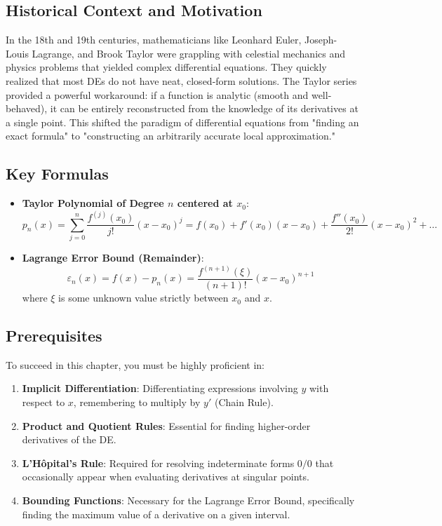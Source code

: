 \documentclass[11pt, letterpaper]{article}
\theoremstyle{definition}
\theoremstyle{remark}
\begin{document}
\subsection{Historical Context and Motivation}
In the 18th and 19th centuries, mathematicians like Leonhard Euler, Joseph-Louis Lagrange, and Brook Taylor were grappling with celestial mechanics and physics problems that yielded complex differential equations. They quickly realized that most DEs do not have neat, closed-form solutions. The Taylor series provided a powerful workaround: if a function is analytic (smooth and well-behaved), it can be entirely reconstructed from the knowledge of its derivatives at a single point. This shifted the paradigm of differential equations from "finding an exact formula" to "constructing an arbitrarily accurate local approximation."

\subsection{Key Formulas}
\begin{itemize}
    \item \textbf{Taylor Polynomial of Degree $n$ centered at $x_0$}:
    \[ p_n(x) = \sum_{j=0}^n \frac{f^{(j)}(x_0)}{j!} (x - x_0)^j = f(x_0) + f'(x_0)(x-x_0) + \frac{f''(x_0)}{2!}(x-x_0)^2 + \dots \]
    \item \textbf{Lagrange Error Bound (Remainder)}:
    \[ \varepsilon_n(x) = f(x) - p_n(x) = \frac{f^{(n+1)}(\xi)}{(n+1)!} (x - x_0)^{n+1} \]
    where $\xi$ is some unknown value strictly between $x_0$ and $x$.
\end{itemize}

\subsection{Prerequisites}
To succeed in this chapter, you must be highly proficient in:
\begin{enumerate}
    \item \textbf{Implicit Differentiation}: Differentiating expressions involving $y$ with respect to $x$, remembering to multiply by $y'$ (Chain Rule).
    \item \textbf{Product and Quotient Rules}: Essential for finding higher-order derivatives of the DE.
    \item \textbf{L'Hôpital's Rule}: Required for resolving indeterminate forms $0/0$ that occasionally appear when evaluating derivatives at singular points.
    \item \textbf{Bounding Functions}: Necessary for the Lagrange Error Bound, specifically finding the maximum value of a derivative on a given interval.
\end{enumerate}
\end{document}
